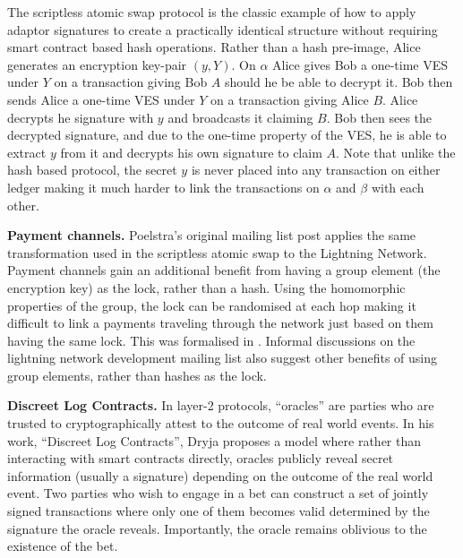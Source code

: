 \documentclass[fullpage]{article}
\theoremstyle{definition}
\begin{document}
The scriptless atomic swap protocol\cite{scriptless-atomic-swap} is the classic example of how to apply adaptor signatures to create a practically identical structure without requiring smart contract based hash operations. Rather than a hash pre-image, Alice generates an encryption key-pair $(y,Y)$. On $\alpha$ Alice gives Bob a one-time VES under $Y$ on a transaction giving Bob $A$ should he be able to decrypt it. Bob then sends Alice a one-time VES under $Y$ on a transaction giving Alice $B$. Alice decrypts he signature with $y$ and broadcasts it claiming $B$. Bob then sees the decrypted signature, and due to the one-time property of the VES, he is able to extract $y$ from it and decrypts his own signature to claim $A$. Note that unlike the hash based protocol, the secret $y$ is never placed into any transaction on either ledger making it much harder to link the transactions on $\alpha$ and $\beta$ with each other.

\hfill \break \textbf{Payment channels.} Poelstra's original mailing list post applies the same transformation used in the scriptless atomic swap to the Lightning Network\cite{poon2016bitcoin}. Payment channels gain an additional benefit from having a group element (the encryption key) as the lock, rather than a hash. Using the homomorphic properties of the group, the lock can be randomised at each hop making it difficult to link a payments traveling through the network just based on them having the same lock. This was formalised in \cite{cryptoeprint:2018:472}. Informal discussions on the lightning network development mailing list also suggest other benefits of using group elements, rather than hashes as the lock\cite{lightning-dev-scriptless-scripts}.

\hfill \break \textbf{Discreet Log Contracts.} In layer-2 protocols, ``oracles'' are parties who are trusted to cryptographically attest to the outcome of real world events. In his work, ``Discreet Log Contracts''\cite{dryja2017discreet}, Dryja proposes a model where rather than interacting with smart contracts directly, oracles publicly reveal secret information (usually a signature) depending on the outcome of the real world event. Two parties who wish to engage in a bet can construct a set of jointly signed transactions where only one of them becomes valid determined by the signature the oracle reveals. Importantly, the oracle remains oblivious to the existence of the bet.
\end{document}
